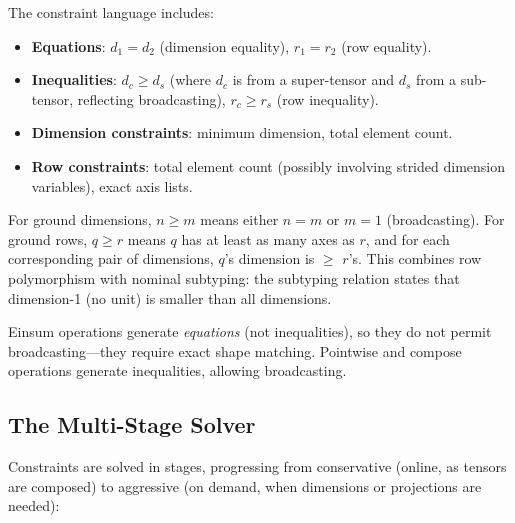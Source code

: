 \documentclass[acmsmall,nonacm,review]{acmart}
\begin{document}
\noindent The constraint language includes:
\begin{itemize}
\item \textbf{Equations}: $d_1 = d_2$ (dimension equality), $r_1 = r_2$ (row
  equality).
\item \textbf{Inequalities}: $d_c \geq d_s$ (where $d_c$ is from a
  super-tensor and $d_s$ from a sub-tensor, reflecting broadcasting),
  $r_c \geq r_s$ (row inequality).
\item \textbf{Dimension constraints}: minimum dimension, total element count.
\item \textbf{Row constraints}: total element count (possibly involving
  strided dimension variables), exact axis lists.
\end{itemize}

For ground dimensions, $n \geq m$ means either $n = m$ or $m = 1$
(broadcasting). For ground rows, $q \geq r$ means $q$ has at least as many
axes as $r$, and for each corresponding pair of dimensions, $q$'s dimension
is $\geq$ $r$'s. This combines row polymorphism with nominal subtyping: the
subtyping relation states that dimension-1 (no unit) is smaller than all
dimensions.

Einsum operations generate \emph{equations} (not inequalities), so they do
not permit broadcasting---they require exact shape matching. Pointwise and
compose operations generate inequalities, allowing broadcasting.

\subsection{The Multi-Stage Solver}
\label{sec:stages}

Constraints are solved in stages, progressing from conservative (online,
as tensors are composed) to aggressive (on demand, when dimensions or
projections are needed):
\end{document}
